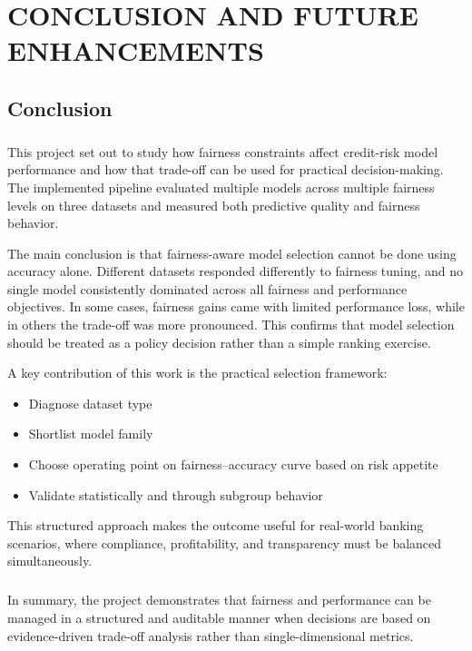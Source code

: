 \chapter{\MakeUppercase{Conclusion and Future Enhancements}}

\section{Conclusion}
\paragraph{}
This project set out to study how fairness constraints affect credit-risk model performance and how that trade-off can be used for practical decision-making. The implemented pipeline evaluated multiple models across multiple fairness levels on three datasets and measured both predictive quality and fairness behavior.

The main conclusion is that fairness-aware model selection cannot be done using accuracy alone. Different datasets responded differently to fairness tuning, and no single model consistently dominated across all fairness and performance objectives. In some cases, fairness gains came with limited performance loss, while in others the trade-off was more pronounced. This confirms that model selection should be treated as a policy decision rather than a simple ranking exercise.

A key contribution of this work is the practical selection framework:
\begin{itemize}
    \item Diagnose dataset type
    \item Shortlist model family
    \item Choose operating point on fairness–accuracy curve based on risk appetite
    \item Validate statistically and through subgroup behavior
\end{itemize}

This structured approach makes the outcome useful for real-world banking scenarios, where compliance, profitability, and transparency must be balanced simultaneously.

\paragraph{}
In summary, the project demonstrates that fairness and performance can be managed in a structured and auditable manner when decisions are based on evidence-driven trade-off analysis rather than single-dimensional metrics.


